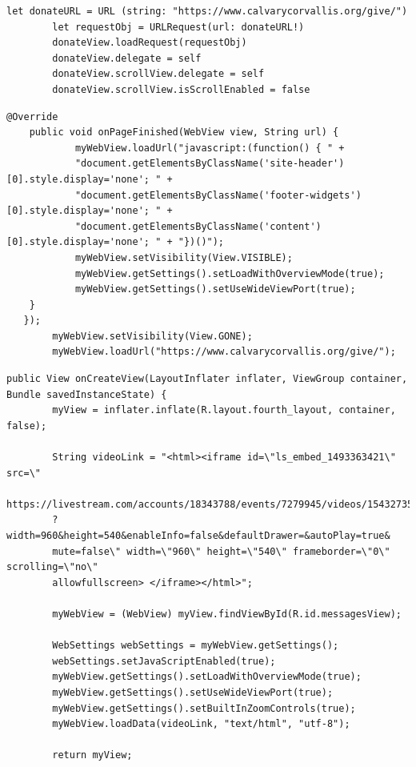 \documentclass[letterpaper,10pt,draftclsnofoot,onecolumn,titlepage]{IEEEtran}
\begin{document}
	
\begin{lstlisting}[caption=iOS Donation Page]
 	let donateURL = URL (string: "https://www.calvarycorvallis.org/give/")
        let requestObj = URLRequest(url: donateURL!)
        donateView.loadRequest(requestObj)      
        donateView.delegate = self     
        donateView.scrollView.delegate = self     
        donateView.scrollView.isScrollEnabled = false
\end{lstlisting}
	
\begin{lstlisting}[caption=Android Donation Page]
@Override
    public void onPageFinished(WebView view, String url) {
            myWebView.loadUrl("javascript:(function() { " +
            "document.getElementsByClassName('site-header')[0].style.display='none'; " +
            "document.getElementsByClassName('footer-widgets')[0].style.display='none'; " +
            "document.getElementsByClassName('content')[0].style.display='none'; " + "})()");
            myWebView.setVisibility(View.VISIBLE);
            myWebView.getSettings().setLoadWithOverviewMode(true);
            myWebView.getSettings().setUseWideViewPort(true);
   	}
   });
        myWebView.setVisibility(View.GONE);
        myWebView.loadUrl("https://www.calvarycorvallis.org/give/");
\end{lstlisting}

\begin{lstlisting}[caption=Android Messages Page]
public View onCreateView(LayoutInflater inflater, ViewGroup container, 
Bundle savedInstanceState) {
        myView = inflater.inflate(R.layout.fourth_layout, container, false);

        String videoLink = "<html><iframe id=\"ls_embed_1493363421\" src=\"
        https://livestream.com/accounts/18343788/events/7279945/videos/154327352/player
        ?width=960&height=540&enableInfo=false&defaultDrawer=&autoPlay=true&
        mute=false\" width=\"960\" height=\"540\" frameborder=\"0\" scrolling=\"no\" 
        allowfullscreen> </iframe></html>";

        myWebView = (WebView) myView.findViewById(R.id.messagesView);

        WebSettings webSettings = myWebView.getSettings();
        webSettings.setJavaScriptEnabled(true);
        myWebView.getSettings().setLoadWithOverviewMode(true);
        myWebView.getSettings().setUseWideViewPort(true);
        myWebView.getSettings().setBuiltInZoomControls(true);
        myWebView.loadData(videoLink, "text/html", "utf-8");

        return myView;
		\end{lstlisting}
\end{document}
